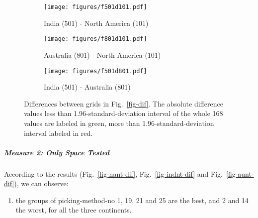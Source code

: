 \begin{figure*}
	\centering
	\begin{subfigure}{1.01\textwidth}
		\texttt{[image: figures/f501d101.pdf]}
		\caption{India (501) - North America (101)}\label{fig-i-n-dif}
	\end{subfigure}
	\vspace{1em}
	\begin{subfigure}{1.01\textwidth}
		\texttt{[image: figures/f801d101.pdf]}
		\caption{Australia (801) - North America (101)}\label{fig-a-n-dif}
	\end{subfigure}
	\vspace{1em}
	\begin{subfigure}{1.01\textwidth}
		\texttt{[image: figures/f501d801.pdf]}
		\caption{India (501) - Australia (801)}\label{fig-i-a-dif}
	\end{subfigure}
	\caption[Differences of differences with test of each plate's paleomagnetic
APWPs versus its FHM predicted APWP]{Differences between grids in
Fig.~\ref{fig-dif}. The absolute difference values less than
1.96-standard-deviation interval of the whole 168 values are labeled in green,
more than 1.96-standard-deviation interval labeled in red.}\label{fig-d-dif}
\end{figure*}

\subparagraph{Measure 2: Only Space Tested}

According to the results (Fig.~\ref{fig-nant-dif}, Fig.~\ref{fig-indnt-dif} and
Fig.~\ref{fig-aunt-dif}), we can observe:
%
\begin{enumerate}
  \item the groups of picking-method-no 1, 19, 21 and 25 are the best, and 2
        and 14 the worst, for all the three continents.
\end{enumerate}

